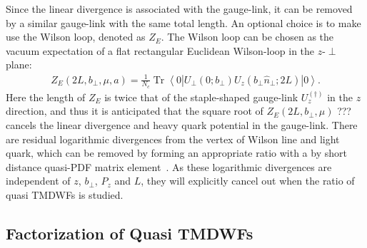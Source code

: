 \documentclass[prd,aps,twocolumn,preprintnumbers, showpacs, nofootinbib,superscriptaddress,notitlepage]{revtex4-1}
\newcommand{\red}[1]{\textcolor{red}{#1}} %
\newcommand\bl{\color{blue}}
\begin{document}
Since the  linear divergence is associated with the gauge-link, it can be removed by a similar gauge-link with the same total length. An  optional choice  is to make use the Wilson loop,  denoted as $Z_E$. The Wilson loop can be chosen  as the vacuum expectation of a flat rectangular Euclidean Wilson-loop {\bl in the} $z$-$\perp$ plane:
\begin{align}\label{eq:WilsonLoop}
Z_E\left(2L, b_{\perp}, \mu,a\right)=\frac{1}{N_{c}} \operatorname{Tr}\left\langle 0\left|U_{\perp}(0;b_{\perp}) U_{z}\left(b_{\perp}\hat{n}_{\perp}; 2L\right)\right| 0\right\rangle. 
\end{align}
Here  the length of $Z_E$ is twice {\bl that} of the staple-shaped gauge-link $U_z^{(\dagger)}$ in the $z$ direction, and thus it is anticipated that the square root of $Z_E\left(2L, b_{\perp}, \mu\right)$ {\bl ??? cancels} the linear divergence and heavy quark potential in {\bl the} gauge-link.  There are residual logarithmic divergences from the vertex of   Wilson line and light quark, which can be removed by {\bl forming an appropriate ratio with a by short distance quasi-PDF matrix element~\cite{Ji:2021uvr}. As} these logarithmic divergences are independent of $z$, $b_{\perp}$, $P_{z}$ and $L$, they will explicitly cancel out when  the ratio of quasi TMDWFs is studied. 



\subsection{Factorization of Quasi TMDWFs}\label{sec:factorizationformula}
\end{document}
